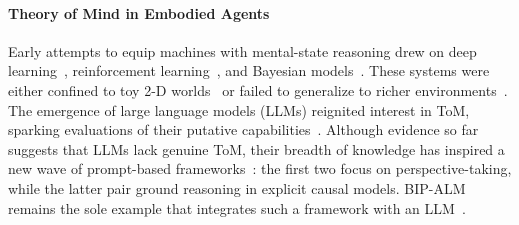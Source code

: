 \documentclass{article}
\begin{document}

\paragraph{Theory of Mind in Embodied Agents} Early attempts to equip machines with mental-state reasoning drew on deep learning~\citep{rabinowitz2018machine, chuang2020using, shu2021agent}, reinforcement learning~\citep{grassiotto2021cogtom}, and Bayesian models~\citep{baker2011bayesian}. These systems were either confined to toy 2-D worlds~\citep{rabinowitz2018machine, chuang2020using} or failed to generalize to richer environments~\citep{shu2021agent}. The emergence of large language models (LLMs) reignited interest in ToM, sparking evaluations of their putative capabilities~\citep{kosinski2023theory, bubeck2023sparks, ullman2023large, gandhi2024understanding}. Although evidence so far suggests that LLMs lack genuine ToM, their breadth of knowledge has inspired a new wave of prompt-based frameworks~\citep{wilf2023think, zhou2023far, sclar2023minding, hao2023reasoning}: the first two focus on perspective-taking, while the latter pair ground reasoning in explicit causal models. BIP-ALM remains the sole example that integrates such a framework with an LLM~\citep{jin2024mmtom, li2023theory}.
\end{document}
